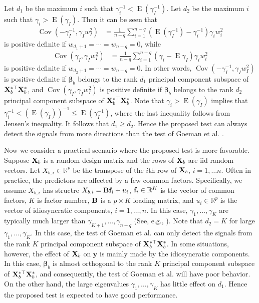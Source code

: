 \documentclass[bj]{imsart}
\DeclareMathOperator{\myE}{E}
\DeclareMathOperator{\myCov}{Cov}
\newcommand{\By}{\mathbf{y}}    \newcommand{\Bz}{\mathbf{z}}
\newcommand{\bfsym}[1]{\ensuremath{\boldsymbol{#1}}}
\def\bbeta{\bfsym \beta}
\theoremstyle{plain}
\theoremstyle{definition}
\theoremstyle{remark}
\begin{document}
Let $d_1$ be the maximum $i$ such that $ \gamma_i^{-1} < \myE (\gamma_I^{-1})$.
Let $d_2$ be the maximum $i$ such that $\gamma_i > \myE (\gamma_I) $.
Then it can be seen that
\begin{align*}
\myCov (-\gamma_I^{-1}, \gamma_I w_I^2)
&=
\frac{1}{n-q} \sum_{i=1}^{n-q} \left(\myE (\gamma_I^{-1})-\gamma_i^{-1} \right) \gamma_i w_i^2
\end{align*}
is positive definite if $w_{d_1+1}=\cdots =w_{n-q}=0$, while
\begin{align*}
    \myCov(\gamma_I, \gamma_I w_I^2)
&=
\frac{1}{n-q} \sum_{i=1}^{n-q} \left(\gamma_i - \myE \gamma_I \right) \gamma_i w_i^2
\end{align*}
is positive definite if $w_{d_2 + 1}=\cdots = w_{n-q}=0$.
In other words, $\myCov(-\gamma_I^{-1}, \gamma_I w_I^2)$ is positive definite if $\bbeta_b$ belongs to the rank $d_1$ principal component subspace of $\mathbf{X}_{b}^{*\top}\mathbf{X}_b^{*}$, and $\myCov(\gamma_I, \gamma_I w_I^2)$ is positive definite if $\bbeta_b$ belongs to the rank $d_2$ principal component subspace of $\mathbf{X}_{b}^{*\top}\mathbf{X}_b^{*}$.
Note that $\gamma_i > \myE (\gamma_I)$ implies that $\gamma_i^{-1} < (\myE (\gamma_I))^{-1}\leq \myE (\gamma_I^{-1})$, where the last inequality follows from Jensen's inequality.
It follows that $ d_1 \geq d_2 $.
Hence the proposed test can always detect the signals from more directions than the test of Goeman {\rm et al.} \cite{Goeman2006}.

Now we consider a practical scenario where the proposed test is more favorable.
Suppose $\mathbf{X}_b$ is a random design matrix and the rows of $\mathbf{X}_b$ are iid random vectors.
Let $X_{b,i}\in \mathbb R^p$ be the transpose of the $i$th row of $\mathbf{X}_b$, $i=1,\ldots n$.
Often in practice, the predictors are affected by a few common factors.
Specifically, we assume $X_{b,i}$ has structre $X_{b,i}= \mathbf{B} \mathbf{f}_i + u_i$, $\mathbf{f}_i \in \mathbb R^K$ is the vector of common factors, $K$ is factor number, $\mathbf{B}$ is a $p\times K$ loading matrix, and $u_i\in \mathbb R^p$ is the vector of idiosyncratic components, $i=1,\ldots,n $.
In this case, $\gamma_1,\ldots, \gamma_K$ are typically much larger than $\gamma_{K+1},\ldots, \gamma_{n-q}$ (See, e.g., \cite{Fan2013Large}).
Note that $d_2=K$ for large $\gamma_1,\ldots, \gamma_K$.
In this case, the test of Goeman {\rm et al.} \cite{Goeman2006} can only detect the signals from the rank $K$ principal component subspace of $\mathbf{X}_b^{*\top} \mathbf{X}_b^*$.
In some situations, however, the effect of $\mathbf{X}_b$ on $\By$ is mainly made by the idiosyncratic components.
In this case, $\bbeta_b$ is almost orthogonal to the rank $K$ principal component subspace of $\mathbf{X}_b^{*\top} \mathbf{X}_b^*$, and consequently, the test of Goeman {\rm et al.} \cite{Goeman2006} will have poor behavior.
On the other hand, the large eigenvalues $\gamma_1,\ldots, \gamma_K$ has little effect on $d_1$.
Hence the proposed test is expected to have good performance.
\end{document}

